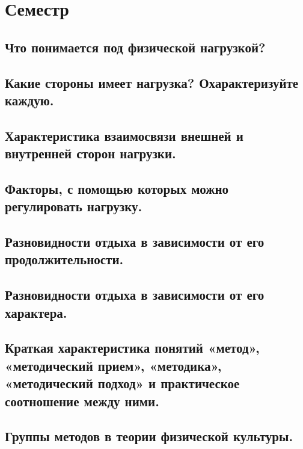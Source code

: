 \section{Семестр}

\subsection{Что понимается под физической нагрузкой?}



\subsection{Какие стороны имеет нагрузка? Охарактеризуйте каждую.}



\subsection{Характеристика взаимосвязи внешней и внутренней сторон нагрузки.}



\subsection{Факторы, с помощью которых можно регулировать нагрузку.}



\subsection{Разновидности отдыха в зависимости от его продолжительности.}



\subsection{Разновидности отдыха в зависимости от его характера.}



\subsection{Краткая характеристика понятий «метод», «методический прием», «методика», «методический подход» и практическое соотношение между ними.}



\subsection{Группы методов в теории физической культуры.}



